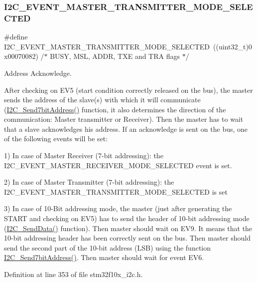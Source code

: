 \subsubsection{\texorpdfstring{I2\+C\+\_\+\+E\+V\+E\+N\+T\+\_\+\+M\+A\+S\+T\+E\+R\+\_\+\+T\+R\+A\+N\+S\+M\+I\+T\+T\+E\+R\+\_\+\+M\+O\+D\+E\+\_\+\+S\+E\+L\+E\+C\+T\+ED}{I2C\_EVENT\_MASTER\_TRANSMITTER\_MODE\_SELECTED}}
{\footnotesize\ttfamily \#define I2\+C\+\_\+\+E\+V\+E\+N\+T\+\_\+\+M\+A\+S\+T\+E\+R\+\_\+\+T\+R\+A\+N\+S\+M\+I\+T\+T\+E\+R\+\_\+\+M\+O\+D\+E\+\_\+\+S\+E\+L\+E\+C\+T\+ED~((uint32\+\_\+t)0x00070082)  /$\ast$ B\+U\+S\+Y, M\+S\+L, A\+D\+D\+R, T\+X\+E and T\+R\+A flags $\ast$/}



Address Acknowledge. 

After checking on E\+V5 (start condition correctly released on the bus), the master sends the address of the slave(s) with which it will communicate (\hyperlink{group___i2_c___exported___functions_ga009fc2a5b2313c36da39ece39a1156a6}{I2\+C\+\_\+\+Send7bit\+Address()} function, it also determines the direction of the communication\+: Master transmitter or Receiver). Then the master has to wait that a slave acknowledges his address. If an acknowledge is sent on the bus, one of the following events will be set\+:

1) In case of Master Receiver (7-\/bit addressing)\+: the I2\+C\+\_\+\+E\+V\+E\+N\+T\+\_\+\+M\+A\+S\+T\+E\+R\+\_\+\+R\+E\+C\+E\+I\+V\+E\+R\+\_\+\+M\+O\+D\+E\+\_\+\+S\+E\+L\+E\+C\+T\+ED event is set.

2) In case of Master Transmitter (7-\/bit addressing)\+: the I2\+C\+\_\+\+E\+V\+E\+N\+T\+\_\+\+M\+A\+S\+T\+E\+R\+\_\+\+T\+R\+A\+N\+S\+M\+I\+T\+T\+E\+R\+\_\+\+M\+O\+D\+E\+\_\+\+S\+E\+L\+E\+C\+T\+ED is set

3) In case of 10-\/\+Bit addressing mode, the master (just after generating the S\+T\+A\+RT and checking on E\+V5) has to send the header of 10-\/bit addressing mode (\hyperlink{group___i2_c___exported___functions_ga7bd9e70b8eafde0dd5eb42b0d95fe1a9}{I2\+C\+\_\+\+Send\+Data()} function). Then master should wait on E\+V9. It means that the 10-\/bit addressing header has been correctly sent on the bus. Then master should send the second part of the 10-\/bit address (L\+SB) using the function \hyperlink{group___i2_c___exported___functions_ga009fc2a5b2313c36da39ece39a1156a6}{I2\+C\+\_\+\+Send7bit\+Address()}. Then master should wait for event E\+V6. 

Definition at line 353 of file stm32f10x\+\_\+i2c.\+h.

